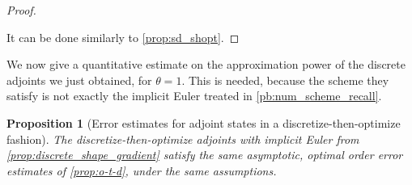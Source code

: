\documentclass[english,a4paper,9pt,oneside]{scrbook}	%
\theoremstyle{break}
\newtheorem{prop}[equation]{Proposition}
\newenvironment{mproof}[1][\proofname]{%
  \begin{proof}[#1]$ $\par\nobreak\ignorespaces
}{%
  \end{proof}
}
\renewcommand*{\proofname}{Proof}
\theoremstyle{remark}
\begin{document}
\begin{mproof}[Proof]
It can be done similarly to \cref{prop:sd_shopt}.
\end{mproof}


We now give a quantitative estimate on the approximation power of the discrete adjoints we just obtained, for $\theta = 1$. This is needed, because the scheme they satisfy is not exactly the implicit Euler treated in \cref{pb:num_scheme_recall}.

\begin{prop}[Error estimates for adjoint states in a discretize-then-optimize fashion]
\label{prop:d-t-o_estimates}
The discretize-then-optimize adjoints with implicit Euler from \cref{prop:discrete_shape_gradient} satisfy the same asymptotic, optimal order error estimates of \cref{prop:o-t-d}, under the same assumptions.
\end{prop}
\end{document}

